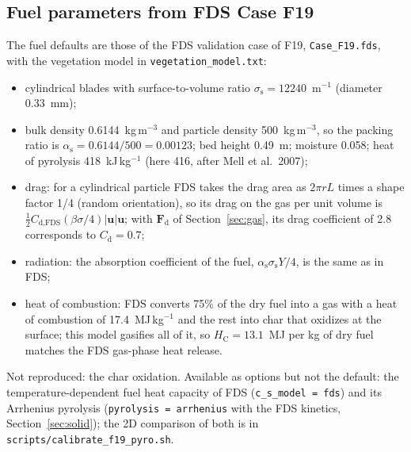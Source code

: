 \documentclass[11pt,a4paper]{article}
\newcommand{\vu}{\mathbf{u}}
\newcommand{\code}[1]{\texttt{#1}}
\begin{document}
\subsection{Fuel parameters from FDS Case F19}\label{sec:fds-fuel}
The fuel defaults are those of the FDS validation case of F19, \code{Case\_F19.fds}, with the
vegetation model in \code{vegetation\_model.txt}:
\begin{itemize}
  \item cylindrical blades with surface-to-volume ratio $\sigma_\text{s}=12240$~m$^{-1}$ (diameter 0.33~mm);
  \item bulk density 0.6144~kg\,m$^{-3}$ and particle density 500~kg\,m$^{-3}$, so the packing ratio is
        $\alpha_\text{s}=0.6144/500=0.00123$; bed height 0.49~m; moisture 0.058; heat of pyrolysis
        418~kJ\,kg$^{-1}$ (here 416, after Mell et al.\ 2007);
  \item drag: for a cylindrical particle FDS takes the drag area as $2\pi rL$ times a shape factor 1/4
        (random orientation), so its drag on the gas per unit volume is
        $\tfrac12 C_{\text{d,FDS}}(\beta\sigma/4)|\vu|\vu$; with $\mathbf F_\text{d}$ of Section~\ref{sec:gas}, its
        drag coefficient of 2.8 corresponds to $C_\text{d}=0.7$;
  \item radiation: the absorption coefficient of the fuel, $\alpha_\text{s}\sigma_\text{s}Y/4$, is the same as in FDS;
  \item heat of combustion: FDS converts 75\% of the dry fuel into a gas with a heat of combustion of
        17.4~MJ\,kg$^{-1}$ and the rest into char that oxidizes at the surface; this model gasifies all
        of it, so $H_\text{C}=13.1$~MJ per kg of dry fuel matches the FDS gas-phase heat release.
\end{itemize}
Not reproduced: the char oxidation. Available as options but not the default: the temperature-dependent
fuel heat capacity of FDS (\code{c\_s\_model = fds}) and its Arrhenius pyrolysis (\code{pyrolysis =
arrhenius} with the FDS kinetics, Section~\ref{sec:solid}); the 2D comparison of both is in
\code{scripts/calibrate\_f19\_pyro.sh}.

\end{document}
